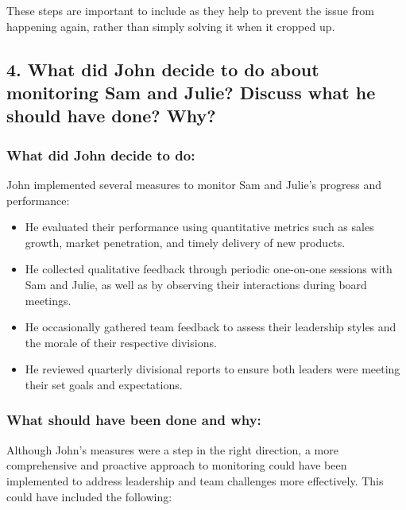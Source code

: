 \documentclass[a4paper,10pt]{article}
\begin{document}
These steps are important to include as they help to prevent the issue from happening again, rather than simply solving it when it cropped up.

\subsection{4. What did John decide to do about monitoring Sam and Julie? Discuss what he should have done? Why?}

\subsubsection{What did John decide to do:}
John implemented several measures to monitor Sam and Julie's progress and performance:

\begin{itemize}
    \item He evaluated their performance using quantitative metrics such as sales growth, market penetration, and timely delivery of new products.
    \item He collected qualitative feedback through periodic one-on-one sessions with Sam and Julie, as well as by observing their interactions during board meetings.
    \item He occasionally gathered team feedback to assess their leadership styles and the morale of their respective divisions.
    \item He reviewed quarterly divisional reports to ensure both leaders were meeting their set goals and expectations.
\end{itemize}

\subsubsection{What should have been done and why:}
Although John's measures were a step in the right direction, a more comprehensive and proactive approach to monitoring could have been implemented to address leadership and team challenges more effectively. This could have included the following:
\end{document}
